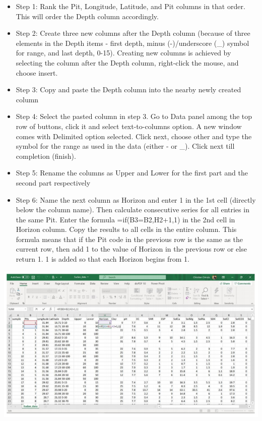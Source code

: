\documentclass[
  10pt,
  b5paper,
]{book}
\providecommand{\tightlist}{%
  \setlength{\itemsep}{0pt}\setlength{\parskip}{0pt}}
\begin{document}
\begin{itemize}
\tightlist
\item
  Step 1: Rank the Pit, Longitude, Latitude, and Pit columns in that order. This will order the Depth column accordingly.
\item
  Step 2: Create three new columns after the Depth column (because of three elements in the Depth items - first depth, minus (-)/underscore (\_) symbol for range, and last depth, 0-15). Creating new columns is achieved by selecting the column after the Depth column, right-click the mouse, and choose insert.
\item
  Step 3: Copy and paste the Depth column into the nearby newly created column
\item
  Step 4: Select the pasted column in step 3. Go to Data panel among the top row of buttons, click it and select text-to-columns option. A new window comes with Delimited option selected. Click next, choose other and type the symbol for the range as used in the data (either - or \_). Click next till completion (finish).
\item
  Step 5: Rename the columns as Upper and Lower for the first part and the second part respectively
\item
  Step 6: Name the next column as Horizon and enter 1 in the 1st cell (directly below the column name). Then calculate consecutive series for all entries in the same Pit. Enter the formula
  =if(B3=B2,H2+1,1) in the 2nd cell in Horizon column. Copy the results to all cells in the entire column. This formula means that if the Pit code in the previous row is the same as the current row, then add 1 to the value of Horizon in the previous row or else return 1. 1 is added so that each Horizon begins from 1.
\end{itemize}

\includegraphics{figures/images/FigureA3.PNG}
\end{document}
